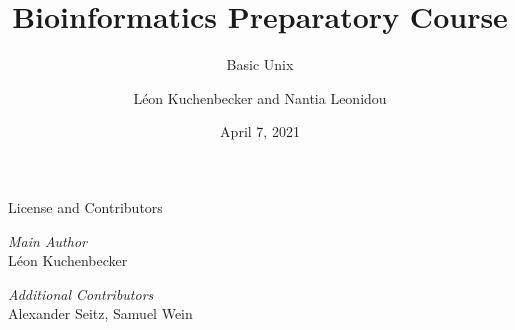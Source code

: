 \documentclass[aspectratio=1610]{beamer}
\title{Bioinformatics Preparatory Course}
\subtitle{Basic Unix}
\author{Léon Kuchenbecker and Nantia Leonidou}
\date{April 7, 2021}
\begin{document}

\begin{frame}
    \titlepage
\end{frame}

\begin{frame}{License and Contributors}
    \medskip

    \emph{Main Author}\\
    Léon Kuchenbecker

    \emph{Additional Contributors}\\
    Alexander Seitz, Samuel Wein
\end{frame}


\end{document}
